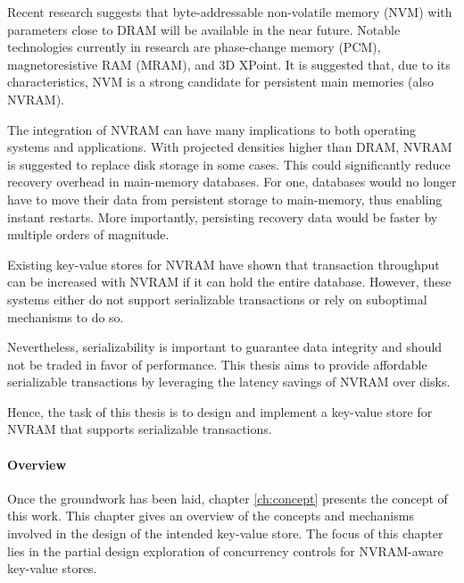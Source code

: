 
Recent research suggests that byte-addressable non-volatile memory (NVM) with
parameters close to DRAM will be available in the near future. Notable
technologies currently in research are phase-change memory (PCM),
magnetoresistive RAM (MRAM), and 3D XPoint. It is suggested that, due to its
characteristics, NVM is a strong candidate for persistent main memories (also
NVRAM).



The integration of NVRAM can have many implications to both operating systems
and applications. With projected densities higher than DRAM, NVRAM is suggested
to replace disk storage in some cases. This could significantly reduce recovery
overhead in main-memory databases. For one, databases would no longer have to
move their data from persistent storage to main-memory, thus enabling instant
restarts. More importantly, persisting recovery data would be faster by multiple
orders of magnitude.

Existing key-value stores for NVRAM have shown that transaction throughput can
be increased with NVRAM if it can hold the entire database. However, these
systems either do not support serializable transactions or rely on suboptimal
mechanisms to do so.

Nevertheless, serializability is important to guarantee data integrity and
should not be traded in favor of performance. This thesis aims to provide
affordable serializable transactions by leveraging the latency savings of NVRAM
over disks.


Hence, the task of this thesis is to design and implement a key-value store for
NVRAM that supports serializable transactions.


\paragraph{Overview}


Once the groundwork has been laid, chapter \ref{ch:concept} presents the concept
of this work. This chapter gives an overview of the concepts and mechanisms
involved in the design of the intended key-value store. The focus of this
chapter lies in the partial design exploration of concurrency controls for
NVRAM-aware key-value stores.


